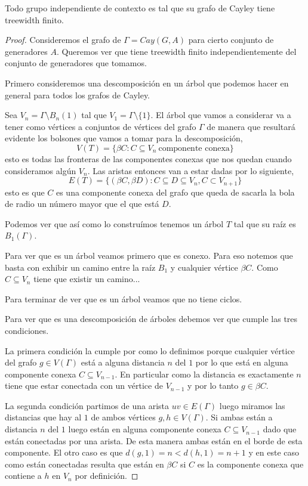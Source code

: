 \documentclass[tesis.tex]{subfiles}
\begin{document}
\begin{teo}
	Todo grupo independiente de contexto es tal que su grafo de Cayley tiene treewidth finito.
\end{teo}
\begin{proof}
Consideremos el grafo de $\Gamma = Cay(G,A)$ para cierto conjunto de generadores $A$. Queremos ver que tiene treewidth finito independientemente del conjunto de generadores que tomamos.
	
Primero consideremos una descomposición en un árbol que podemos hacer en general para todos los grafos de Cayley. 

Sea $V_n = \Gamma \setminus B_n(1) $ tal que $V_1 = \Gamma \setminus \{1\}$. El árbol que vamos a considerar va a tener como vértices a conjuntos de vértices del grafo $\Gamma$ de manera que resultará evidente los bolsones que vamos a tomar para la descomposición,
\[
V(T) = \{  \beta C : C \subseteq V_n \ \text{componente conexa}   \}
\]
esto es todas las fronteras de las componentes conexas que nos quedan cuando consideramos algún $V_n$. Las aristas entonces van a estar dadas por lo siguiente,
\[
E(T) = \{ (\beta C, \beta D) : C \subseteq D \subseteq V_n, C \subset V_{n+1}   \}
\]
esto es que $C$ es una componente conexa del grafo que queda de sacarla la bola de radio un número mayor que el que está $D$.

Podemos ver que así como lo construímos tenemos un árbol $T$ tal que su raíz es $B_1(\Gamma)$. 

Para ver que es un árbol veamos primero que es conexo. Para eso notemos que basta con exhibir un camino entre la raíz $B_1$ y cualquier vértice $\beta C$. Como $C \subseteq V_n$ tiene que existir un camino...

Para terminar de ver que es un árbol veamos que no tiene ciclos. 

Para ver que es una descomposición de árboles debemos ver que cumple las tres condiciones. 

La primera condición la cumple por como lo definimos porque cualquier vértice del grafo $g \in V(\Gamma)$ está a alguna distancia $n$ del $1$ por lo que está en alguna componente conexa $C \subseteq V_{n-1}$. En particular como la distancia es exactamente $n$ tiene que estar conectada con un vértice de $V_{n-1}$ y por lo tanto $g \in \beta C$.

La segunda condición partimos de una arista $uv \in E(\Gamma)$ luego miramos las distancias que hay al $1$ de ambos vértices $g,h \in V(\Gamma)$. Si ambas están a distancia $n$ del $1$ luego están en alguna componente conexa $C \subseteq V_{n-1}$ dado que están conectadas por una arista. De esta manera ambas están en el borde de esta componente. El otro caso es que $d(g,1)=n < d(h,1)=n+1$ y en este caso como están conectadas resulta que están en $\beta C$ si $C$ es la componente conexa que contiene a $h$ en $V_n$ por definición.


\end{proof}
\end{document}
